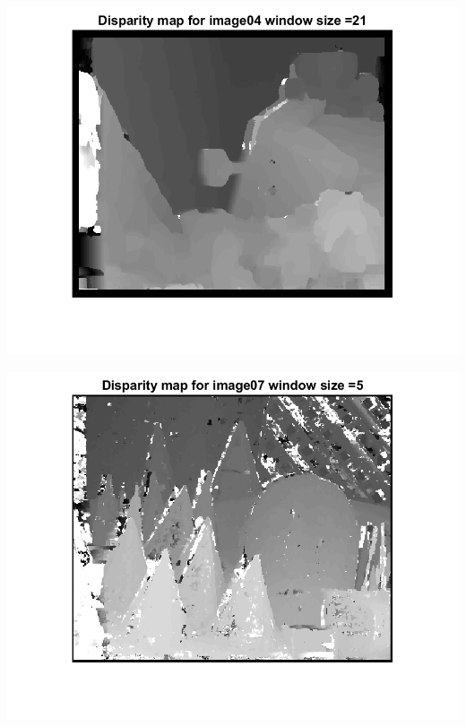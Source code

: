 \documentclass[a4paper]{iacas}
\begin{document}
\begin{minipage}{\linewidth}
	\includegraphics[scale=1]{results/04_16_06/disp_map_04_template_3.png}
	\label{fig_4}
\end{minipage}
\vskip 0.1in
\begin{minipage}{\linewidth}
	\includegraphics[scale=1]{results/04_16_06/disp_map_07_template_1.png}
	\label{fig_4}
\end{minipage}
\vskip 0.1in
\end{document}
